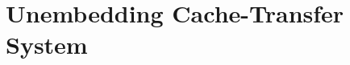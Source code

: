 \documentclass{article}
\theoremstyle{definition}
\begin{document}
           




\section{Unembedding Cache-Transfer System}
\end{document}
